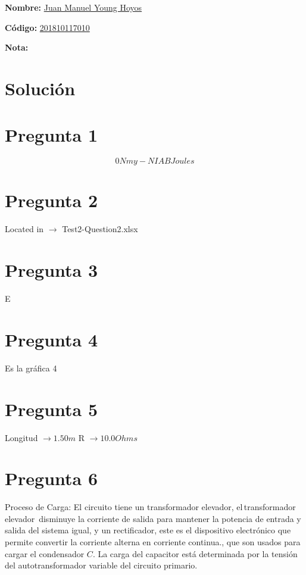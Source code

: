 \documentclass{exam}
\begin{document}
\begin{center}
\end{center}

\textbf{Nombre:} \underline{Juan Manuel Young Hoyos} \enspace\hrulefill

\textbf{Código:} \underline{201810117010} \enspace\hrulefill

\textbf{Nota:\enspace\hrulefill}

    \section*{Solución}

    \section*{Pregunta 1}

    \[ 0 Nm y -NIAB Joules \]

    \section*{Pregunta 2}

    Located in $\rightarrow$ Test2-Question2.xlsx

    \section*{Pregunta 3}

    E

    \section*{Pregunta 4}

    Es la gráfica 4

    \section*{Pregunta 5}

    Longitud $\rightarrow 1.50m$
    R $\rightarrow 10.0 Ohms$

    \section*{Pregunta 6}

    Proceso de Carga: El circuito tiene un transformador elevador, el transformador elevador  
    disminuye la corriente de salida para mantener la potencia de entrada y salida del sistema igual,
    y un rectificador, este es el dispositivo electrónico que permite convertir la corriente alterna en 
    corriente continua.​, que son usados para cargar el condensador $C$. La carga del capacitor está 
    determinada por la tensión del autotransformador variable del circuito primario. 
\end{document}
